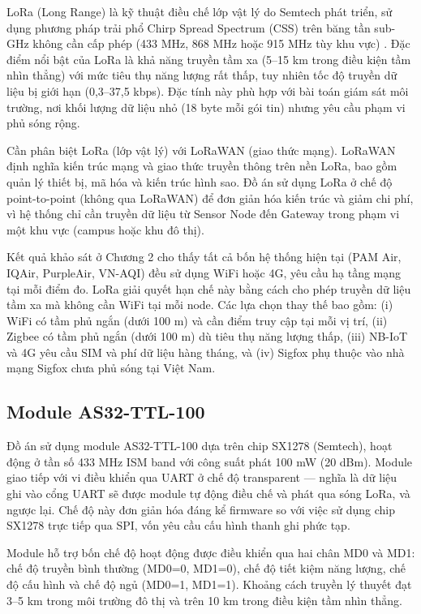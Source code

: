 \documentclass[../DoAn.tex]{subfiles}
\begin{document}
\gls{LoRa} (Long Range) là kỹ thuật điều chế lớp vật lý do Semtech phát triển, sử dụng phương pháp trải phổ Chirp Spread Spectrum (CSS) trên băng tần sub-GHz không cần cấp phép (433 MHz, 868 MHz hoặc 915 MHz tùy khu vực) \cite{augustin2016}. Đặc điểm nổi bật của \gls{LoRa} là khả năng truyền tầm xa (5--15 km trong điều kiện tầm nhìn thẳng) với mức tiêu thụ năng lượng rất thấp, tuy nhiên tốc độ truyền dữ liệu bị giới hạn (0,3--37,5 kbps). Đặc tính này phù hợp với bài toán giám sát môi trường, nơi khối lượng dữ liệu nhỏ (18 byte mỗi gói tin) nhưng yêu cầu phạm vi phủ sóng rộng.

Cần phân biệt \gls{LoRa} (lớp vật lý) với LoRaWAN (giao thức mạng). LoRaWAN định nghĩa kiến trúc mạng và giao thức truyền thông trên nền \gls{LoRa}, bao gồm quản lý thiết bị, mã hóa và kiến trúc hình sao. Đồ án sử dụng \gls{LoRa} ở chế độ point-to-point (không qua LoRaWAN) để đơn giản hóa kiến trúc và giảm chi phí, vì hệ thống chỉ cần truyền dữ liệu từ Sensor Node đến Gateway trong phạm vi một khu vực (campus hoặc khu đô thị).

Kết quả khảo sát ở Chương 2 cho thấy tất cả bốn hệ thống hiện tại (PAM Air, IQAir, PurpleAir, VN-AQI) đều sử dụng WiFi hoặc 4G, yêu cầu hạ tầng mạng tại mỗi điểm đo. \gls{LoRa} giải quyết hạn chế này bằng cách cho phép truyền dữ liệu tầm xa mà không cần WiFi tại mỗi node. Các lựa chọn thay thế bao gồm: (i) WiFi có tầm phủ ngắn (dưới 100 m) và cần điểm truy cập tại mỗi vị trí, (ii) Zigbee có tầm phủ ngắn (dưới 100 m) dù tiêu thụ năng lượng thấp, (iii) NB-IoT và 4G yêu cầu SIM và phí dữ liệu hàng tháng, và (iv) Sigfox phụ thuộc vào nhà mạng Sigfox chưa phủ sóng tại Việt Nam.

\subsection{Module AS32-TTL-100}
\label{subsection:3.3.2}

Đồ án sử dụng module AS32-TTL-100 dựa trên chip SX1278 (Semtech), hoạt động ở tần số 433 MHz ISM band với công suất phát 100 mW (20 dBm). Module giao tiếp với vi điều khiển qua \gls{UART} ở chế độ transparent — nghĩa là dữ liệu ghi vào cổng \gls{UART} sẽ được module tự động điều chế và phát qua sóng \gls{LoRa}, và ngược lại. Chế độ này đơn giản hóa đáng kể firmware so với việc sử dụng chip SX1278 trực tiếp qua SPI, vốn yêu cầu cấu hình thanh ghi phức tạp.

Module hỗ trợ bốn chế độ hoạt động được điều khiển qua hai chân MD0 và MD1: chế độ truyền bình thường (MD0=0, MD1=0), chế độ tiết kiệm năng lượng, chế độ cấu hình và chế độ ngủ (MD0=1, MD1=1). Khoảng cách truyền lý thuyết đạt 3--5 km trong môi trường đô thị và trên 10 km trong điều kiện tầm nhìn thẳng.
\end{document}
